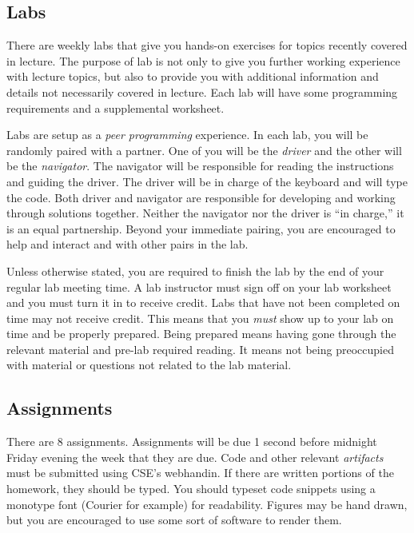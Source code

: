 \documentclass[12pt]{scrartcl}
\begin{document}
\subsection{Labs}

There are weekly labs that give you hands-on exercises for 
topics recently covered in lecture.  The purpose of lab is not 
only to give you further working experience with lecture topics, 
but also to provide you with additional information and details 
not necessarily covered in lecture.  Each lab will have some 
programming requirements and a supplemental worksheet.  

Labs are setup as a \emph{peer programming} experience.  In each 
lab, you will be randomly paired with a partner.  One of you will 
be the \emph{driver} and the other will be the \emph{navigator}.  
The navigator will be responsible for reading the instructions 
and guiding the driver.  The driver will be in charge of the 
keyboard and will type the code.  Both driver and navigator are 
responsible for developing and working through solutions together.
Neither the navigator nor the driver is ``in charge,'' it is an 
equal partnership.  Beyond your immediate pairing, you are 
encouraged to help and interact and with other pairs in the lab.

Unless otherwise stated, you are required to finish the lab by 
the end of your regular lab meeting time.  A lab instructor must 
sign off on your lab worksheet and you must turn it in to receive 
credit.  Labs that have not been completed on time may not receive
credit. This means that you \emph{must} show up to your lab on
time and be properly prepared.  Being prepared means having gone
through the relevant material and pre-lab required reading.  It 
means not being preoccupied with material or questions not related
to the lab material.  

\subsection{Assignments}

There are 8 assignments.  Assignments will be due 1 second before 
midnight Friday evening the week that they are due.  Code and other 
relevant \emph{artifacts} must be submitted using CSE's webhandin.  
If there are written portions of the homework, they should be typed.  
You should typeset code snippets using a monotype font (Courier for 
example) for readability.  Figures may be hand drawn, but you are 
encouraged to use some sort of software to render them.  
\end{document}
